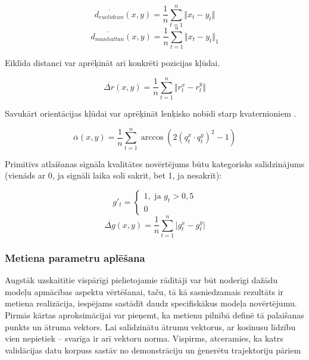\documentclass[12pt, a4paper]{article}
\numberwithin{equation}{section} %
\begin{document}
\begin{equation}
    \overline{d_{euclidean}}(x,y) = \frac{1}{n} \sum_{t=1}^{n} \Vert x_t - y_t \Vert
\end{equation}
\begin{equation}
    \overline{d_{manhattan}}(x,y) = \frac{1}{n} \sum_{t=1}^{n} \Vert x_t - y_t \Vert_1
\end{equation}

Eiklīda distanci var aprēķināt arī konkrēti pozīcijas kļūdai.

\begin{equation}
    \overline{\Delta r}(x,y) = \frac{1}{n} \sum_{t=1}^{n} \Vert r^x_t - r^y_t \Vert
\end{equation}

Savukārt orientācijas kļūdai var aprēķināt lenķisko nobīdi starp kvaternioniem \cite{quat_distance}.

\begin{equation}
    \overline{\alpha}(x,y) = \frac{1}{n} \sum_{t=1}^{n} \arccos \left (2(q^x_t \cdot q^y_t)^2 - 1 \right )
\end{equation}

Primitīvs atlaišanas signāla kvalitātes novērtējums būtu kategorisks salīdzinājums (vienāds ar 0, ja signāli laika solī sakrīt, bet 1, ja nesakrīt):

\begin{equation}
    g'_t = 
    \begin{cases}
        1, \text{ ja } g_t > 0,5 \\
        0
    \end{cases}
\end{equation}
\begin{equation}
    \overline{\Delta g}(x,y) = \frac{1}{n} \sum_{t=1}^{n} \vert g^x_t - g^y_t \vert
\end{equation}

\subsubsection{Metiena parametru aplēšana}

Augstāk uzskaitītie vispārīgi pielietojamie rādītāji var būt noderīgi dažādu modeļu apmācības aspektu vērtēšanai, taču, tā kā sasniedzamais rezultāts ir metiena realizācija, iespējams sastādīt daudz specifiskākus modeļa novērtējumu. Pirmās kārtas aproksimācijai var pieņemt, ka metienu pilnībā definē tā palaišanas punkts un ātruma vektors. Lai salīdzinātu ātrumu vektorus, ar kosīnusu līdzību vien nepietiek -- svarīga ir arī vektoru norma. Vispirms, atceramies, ka katrs validācijas datu korpuss sastāv no demonstrāciju un ģenerētu trajektoriju pāriem
\end{document}
